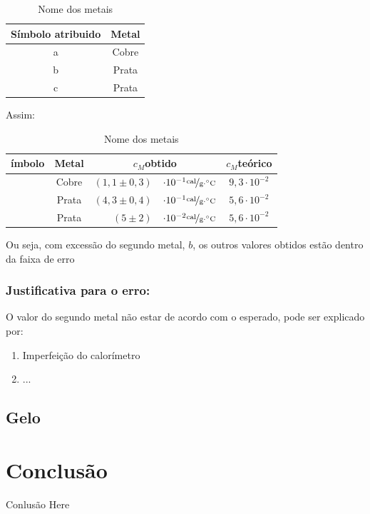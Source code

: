 \documentclass[a4paper]{article}
\providecommand{\tabularnewline}{\\}
\providecommand{\tabularnewline}{\\} %
\begin{document}
				\begin{table}[!ht]
					\caption{Nome dos metais}

					\centering{}%
					\begin{tabular}{|c|c|}
					\hline Símbolo atribuido & Metal\tabularnewline
					\hline a & Cobre\tabularnewline
					\hline b & Prata\tabularnewline
					\hline c & Prata\tabularnewline \hline 
					\end{tabular}
				\end{table}


				Assim:

				\begin{table}[!ht]
					\caption{Nome dos metais}

					\centering{}%
					\begin{tabular}{|c|c|rl|c|}
						\hline ímbolo & Metal & \multicolumn{2}{c|}{$c_{M}$obtido} & $c_{M}$teórico\tabularnewline
						\hline  & Cobre & $\left(1,1\pm0,3\right)$  & $\cdot10^{-1}\unitfrac{cal}{g\cdot^{\circ}C}$ & $9,3\cdot10^{-2}$\tabularnewline
						\hline  & Prata & $\left(4,3\pm0,4\right)$  & $\cdot10^{-1}\unitfrac{cal}{g\cdot^{\circ}C}$ & $5,6\cdot10^{-2}$\tabularnewline
						\hline  & Prata & $\left(5\pm2\right)$  & $\cdot10^{-2}\unitfrac{cal}{g\cdot^{\circ}C}$ & $5,6\cdot10^{-2}$\tabularnewline
						\hline 
					\end{tabular}
				\end{table}


				Ou seja, com excessão do segundo metal, $b$, os outros valores obtidos
				estão dentro da faixa de erro


			\subsubsection{Justificativa para o erro:}

				O valor do segundo metal não estar de acordo com o esperado, pode
				ser explicado por:
				\begin{enumerate}
					\item Imperfeição do calorímetro
					\item ...
				\end{enumerate}

		\subsection{Gelo}


	\section{Conclusão}

	Conlusão Here 
\end{document}
